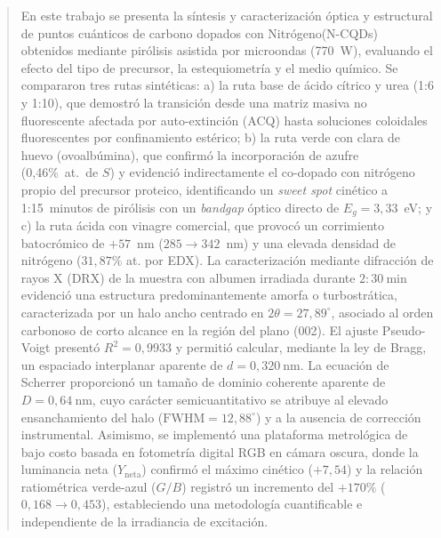 \documentclass[10pt,a4paper]{article}
\begin{document}
	\begin{abstract}
\noindent En este trabajo se presenta la síntesis y caracterización óptica y estructural de puntos cuánticos de carbono dopados con Nitrógeno(N-CQDs) obtenidos mediante pirólisis asistida por microondas (770~W), evaluando el efecto del tipo de precursor, la estequiometría y el medio químico. Se compararon tres rutas sintéticas: a) la ruta base de ácido cítrico y urea (1:6 y 1:10), que demostró la transición desde una matriz masiva no fluorescente afectada por auto-extinción (ACQ) hasta soluciones coloidales fluorescentes por confinamiento estérico; b) la ruta verde con clara de huevo (ovoalbúmina), que confirmó la incorporación de azufre (0,46\%~at.\ de $S$) y evidenció indirectamente el co-dopado con nitrógeno propio del precursor proteico, identificando un \textit{sweet spot} cinético a 1:15~minutos de pirólisis con un \textit{bandgap} óptico directo de $E_g = 3{,}33$~eV; y c) la ruta ácida con vinagre comercial, que provocó un corrimiento batocrómico de $+57$~nm ($285 \to 342$~nm) y una elevada densidad de nitrógeno ($31{,}87\%$ at. por EDX). La caracterización mediante difracción de rayos X (DRX) de la muestra con albumen irradiada durante \(2{:}30~\mathrm{min}\) evidenció una estructura predominantemente amorfa o turbostrática, caracterizada por un halo ancho centrado en \(2\theta=27{,}89^\circ\), asociado al orden
carbonoso de corto alcance en la región del plano (002). El ajuste Pseudo-Voigt presentó \(R^2=0{,}9933\) y permitió calcular, mediante la
ley de Bragg, un espaciado interplanar aparente de \(d=0{,}320~\mathrm{nm}\). La ecuación de Scherrer proporcionó un
tamaño de dominio coherente aparente de \(D=0{,}64~\mathrm{nm}\), cuyo carácter semicuantitativo se atribuye al elevado ensanchamiento del
halo (\(\mathrm{FWHM}=12{,}88^\circ\)) y a la ausencia de corrección instrumental. Asimismo, se implementó una plataforma metrológica de bajo costo basada en fotometría digital RGB en cámara oscura, donde la luminancia neta ($Y_{\text{neta}}$) confirmó el máximo cinético ($+7{,}54$) y la relación ratiométrica verde-azul ($G/B$) registró un incremento del $+170\%$ ($0{,}168 \to 0{,}453$), estableciendo una metodología cuantificable e independiente de la irradiancia de excitación.



\end{abstract}
\end{document}
